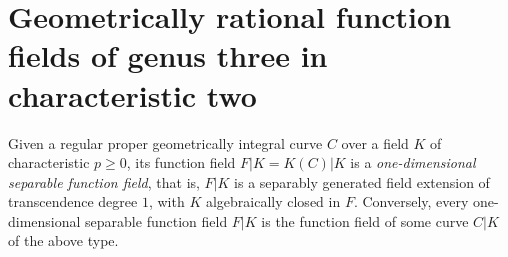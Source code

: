 \documentclass[12pt,reqno]{amsart}
\theoremstyle{definition}
\newcommand{\pp}{\mathfrak{p}}
\DeclareMathOperator{\Spec}{Spec}%
\begin{document}

\section{Geometrically rational function fields of genus three in characteristic two}
\label{2024_04_05_18:25}

Given a regular proper geometrically integral curve $C$ over a field $K$ of characteristic $p\geq0$, its function field $F|K = K(C)|K$ is a \emph{one-dimensional separable function field}, that is, $F|K$ is a separably generated field extension of transcendence degree $1$, with $K$ algebraically closed in $F$.
Conversely, every one-dimensional separable function field $F|K$ is the function field of some curve $C|K$ of the above type.
\end{document}
